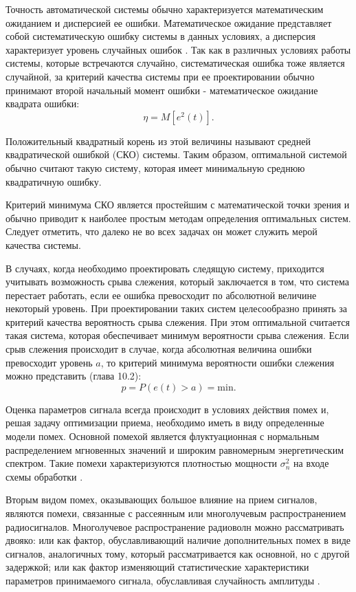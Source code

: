 Точность автоматической системы обычно характеризуется математическим ожиданием и дисперсией ее ошибки.
Математическое ожидание представляет собой систематическую ошибку системы в данных условиях, а дисперсия
характеризует уровень случайных ошибок \cite{pugachev}. Так как в различных условиях работы
системы, которые встречаются случайно, систематическая ошибка тоже является случайной, за критерий качества
системы при ее проектировании обычно принимают второй начальный момент ошибки - математическое ожидание
квадрата ошибки:
\begin{equation}
	\label{eq:stat_err_prob}
	\eta = M[e^2(t)].
\end{equation}

Положительный квадратный корень из этой величины называют средней квадратической ошибкой  (СКО) системы. Таким образом,
оптимальной системой обычно считают такую систему, которая имеет минимальную среднюю квадратичную ошибку.

Критерий минимума СКО является простейшим с математической точки зрения и обычно приводит
к наиболее простым методам определения оптимальных систем. Следует отметить, что далеко не во всех задачах он может служить мерой
качества системы. 

В случаях, когда необходимо проектировать следящую систему, приходится учитывать возможность срыва слежения,
который заключается в том, что система перестает работать, если ее ошибка превосходит по абсолютной величине некоторый
уровень. При проектировании таких систем целесообразно принять за критерий качества вероятность срыва слежения. При
этом оптимальной считается такая система, которая обеспечивает минимум вероятности срыва слежения. Если срыв слежения
происходит в случае, когда абсолютная величина ошибки превосходит уровень $a$, то критерий минимума вероятности ошибки
слежения можно представить \cite{pugachev} (глава 10.2):
\begin{equation}
	\label{eq:prob_lost_signal}
	p = P(e(t) > a) = \mbox{min}.
\end{equation}

Оценка параметров сигнала всегда происходит в условиях действия помех и, решая задачу оптимизации приема,
необходимо иметь в виду определенные модели помех. Основной помехой является флуктуационная с нормальным
распределением мгновенных значений и широким равномерным энергетическим спектром. Такие помехи характеризуются
плотностью мощности ${\sigma_n^2}$ на входе схемы обработки \cite{pestryakov-book}.

Вторым видом помех, оказывающих
большое влияние на прием сигналов, являются помехи, связанные с рассеянным или многолучевым распространением
радиосигналов. Многолучевое распространение радиоволн можно рассматривать двояко: или как фактор, обуславливающий
наличие дополнительных помех в виде сигналов, аналогичных тому, который рассматривается как основной, но с другой
задержкой; или как фактор изменяющий статистические характеристики параметров принимаемого сигнала,
обуславливая случайность амплитуды \cite{pestryakov-book}.

